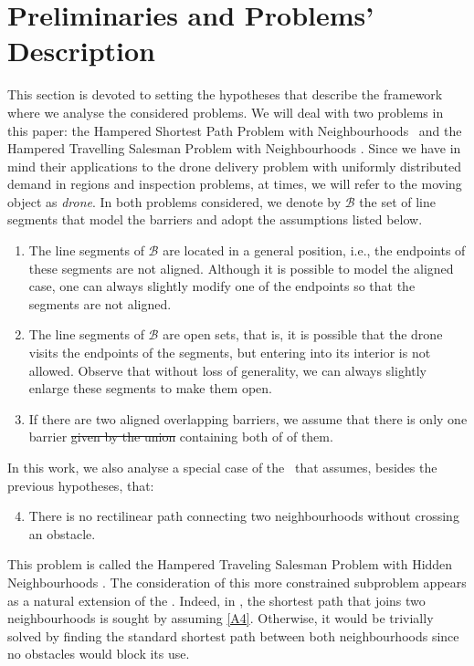 \documentclass[a4paper,  review, authoryear, 1p.]{elsarticle}
\newcommand{\SPPN}{{\sf{H-SPPN}\xspace }}
\newcommand{\TSPHN}{{\sf{H-TSPHN}\xspace }}
\newcommand{\TSPN}{{\sf{H-TSPN}\xspace }}
\newcommand{\CV}[1]{{\color{red}#1}}
\begin{document}
	
	\section{Preliminaries and Problems'  Description \label{section:description}}
	This section is devoted to setting the hypotheses that describe the framework where we analyse the considered problems.
	We will deal with two problems in this paper: the Hampered Shortest Path Problem with Neighbourhoods \SPPN \ and the Hampered Travelling Salesman Problem with Neighbourhoods \TSPN. Since we have in mind their applications to the drone delivery problem with uniformly distributed demand in regions and inspection problems, at times, we will refer to the moving object as \textit{drone}. In both problems considered, we denote by $\mathcal{B}$ the set of line segments that model the barriers and adopt the assumptions listed below.
	
	\begin{enumerate}[label=\textbf{A\arabic*},ref=\textbf{A\arabic*}]
		\item \label{A1}The line segments of $\mathcal B$ are located in a general position, i.e., the endpoints of these segments are not aligned. Although it is possible to model the aligned case, one can always slightly modify one of the endpoints so that the segments are not aligned.
		\item The line segments of $\mathcal B$ are open sets, that is, it is possible that the drone visits the endpoints of the segments, but entering into its interior is not allowed. Observe that without loss of generality, we can always slightly enlarge these segments to make them open.
		\item \label{A3}If there are two \CV{aligned} overlapping barriers, we assume that there is only one barrier \sout{given by the union} \CV{containing both of} of them.
	\end{enumerate}
	
	In this work, we also analyse a special case of the \TSPN \ that assumes, besides the previous hypotheses, that:
	\begin{enumerate}[label=\textbf{A\arabic*}, ref=\textbf{A\arabic*}]
		\setcounter{enumi}{3}
		\item \label{A4}There is no rectilinear path connecting two neighbourhoods without crossing an obstacle.
	\end{enumerate} 
	This problem is called the Hampered Traveling Salesman Problem with Hidden Neighbourhoods \TSPHN. The consideration of this more constrained subproblem appears as a natural extension of the \SPPN. Indeed, in \SPPN, the shortest path that joins two neighbourhoods is sought by assuming \ref{A4}. Otherwise, it would be trivially solved by finding the standard shortest path between both neighbourhoods since no obstacles would block its use.
	
\end{document}

